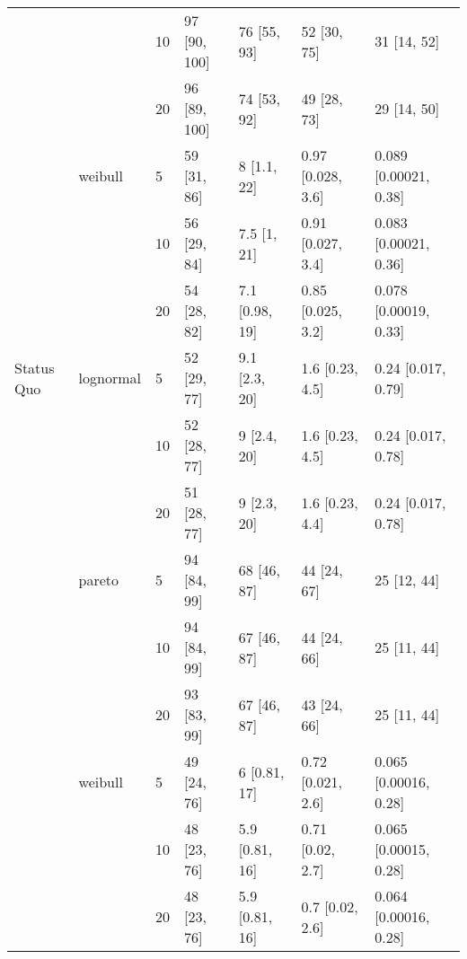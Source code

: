 \begin{tabular}{lllllll}
           &         & 10 &           97 [90, 100] &            76 [55, 93] &            52 [30, 75] &             31 [14, 52] \\
           &         & 20 &           96 [89, 100] &            74 [53, 92] &            49 [28, 73] &             29 [14, 50] \\
           & weibull & 5  &            59 [31, 86] &            8 [1.1, 22] &      0.97 [0.028, 3.6] &   0.089 [0.00021, 0.38] \\
           &         & 10 &            56 [29, 84] &            7.5 [1, 21] &      0.91 [0.027, 3.4] &   0.083 [0.00021, 0.36] \\
           &         & 20 &            54 [28, 82] &         7.1 [0.98, 19] &      0.85 [0.025, 3.2] &   0.078 [0.00019, 0.33] \\
Status Quo & lognormal & 5  &            52 [29, 77] &          9.1 [2.3, 20] &        1.6 [0.23, 4.5] &      0.24 [0.017, 0.79] \\
           &         & 10 &            52 [28, 77] &            9 [2.4, 20] &        1.6 [0.23, 4.5] &      0.24 [0.017, 0.78] \\
           &         & 20 &            51 [28, 77] &            9 [2.3, 20] &        1.6 [0.23, 4.4] &      0.24 [0.017, 0.78] \\
           & pareto & 5  &            94 [84, 99] &            68 [46, 87] &            44 [24, 67] &             25 [12, 44] \\
           &         & 10 &            94 [84, 99] &            67 [46, 87] &            44 [24, 66] &             25 [11, 44] \\
           &         & 20 &            93 [83, 99] &            67 [46, 87] &            43 [24, 66] &             25 [11, 44] \\
           & weibull & 5  &            49 [24, 76] &           6 [0.81, 17] &      0.72 [0.021, 2.6] &   0.065 [0.00016, 0.28] \\
           &         & 10 &            48 [23, 76] &         5.9 [0.81, 16] &       0.71 [0.02, 2.7] &   0.065 [0.00015, 0.28] \\
           &         & 20 &            48 [23, 76] &         5.9 [0.81, 16] &        0.7 [0.02, 2.6] &   0.064 [0.00016, 0.28] \\
\bottomrule
\end{tabular}
